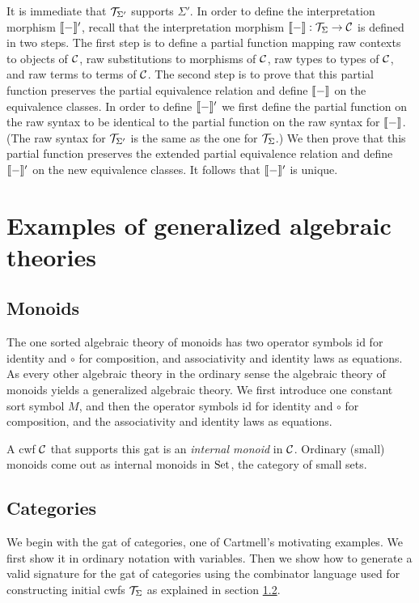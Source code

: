 \documentclass{lmcs}
\def\id{\mathrm{id}}
\begin{document}
\begin{description}
It is immediate that ${\mathcal T}_{\Sigma'}$ supports $\Sigma'$. In order to define the
interpretation morphism $\llbracket - \rrbracket'$, recall that the interpretation morphism $\llbracket - \rrbracket : {\mathcal T}_\Sigma \to {\mathcal C}$ is defined in two steps. The first step is to define a partial function mapping raw contexts to objects of ${\mathcal C}$, raw substitutions to morphisms of ${\mathcal C}$, raw types to types of ${\mathcal C}$, and raw terms to terms of ${\mathcal C}$. The second step is to prove that this partial function preserves the partial equivalence relation and define $\llbracket - \rrbracket$ on the equivalence classes. In order to define $\llbracket - \rrbracket'$ we first define the partial function on the raw syntax to be identical to the partial function on the raw syntax for $\llbracket - \rrbracket$. (The raw syntax for ${\mathcal T}_{\Sigma'}$ is the same as the one for ${\mathcal T}_\Sigma$.) We then prove that this partial function preserves the extended partial equivalence relation and define $\llbracket - \rrbracket'$ on the new equivalence classes. It follows that $\llbracket - \rrbracket'$ is unique.\end{description}

\section{Examples of generalized algebraic theories}

\subsection{Monoids} The one sorted algebraic theory of monoids has two operator symbols  $\id$ for identity and $\circ$ for composition, and associativity and identity laws as equations. As every other algebraic theory in the ordinary sense the algebraic theory of monoids yields a generalized algebraic theory. We first introduce one constant sort symbol $M$, and then the operator symbols $\id$ for identity and $\circ$ for composition, and the associativity and identity laws as equations. 

A cwf ${\mathcal C}$ that supports this gat is an {\em internal monoid} in ${\mathcal C}$. Ordinary (small) monoids come out as internal monoids in ${\rm Set}$, the category of small sets.

\subsection{Categories} We begin with the gat of categories, one of Cartmell's motivating examples. We first show it in ordinary notation with variables. Then we show how to generate a valid signature for the gat of categories using the combinator language used for constructing initial cwfs ${\mathcal T}_\Sigma$ as explained in section \ref{}.
\end{document}
